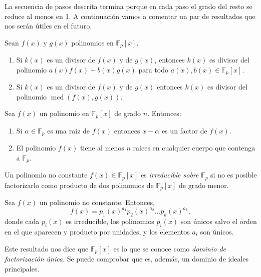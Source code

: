 La secuencia de pasos descrita termina porque en cada paso el grado del resto se reduce al menos en 1.
A continuación vamos a comentar un par de resultados que nos serán útiles en el futuro.

\begin{proposition}
  \label{prop:k-divisor-f-g}
  Sean \(f(x)\) y \(g(x)\) polinomios en \(\mathbb F_p[x]\).
  \begin{enumerate}
    \item Si \(k(x)\) es un divisor de \(f(x)\) y de \(g(x)\), entonces \(k(x)\) es divisor del polinomio \(a(x)f(x) + b(x)g(x)\) para todo \(a(x), b(x) \in \mathbb F_p[x]\).
    \item Si \(k(x)\) es un divisor de \(f(x)\) y de \(g(x)\) entonces \(k(x)\) es divisor del polinomio \(\operatorname{mcd}(f(x), g(x))\).
  \end{enumerate}
\end{proposition}

\begin{proposition}
  \label{prop:raices-factores-pol-Fp}
  Sea \(f(x)\) un polinomio en \(\mathbb F_p[x]\) de grado \(n\). 
  Entonces: 
  \begin{enumerate}
    \item Si \(\alpha \in \mathbb F_p\) es una raíz de \(f(x)\) entonces \(x - \alpha\) es un factor de \(f(x)\).
    \item El polinomio \(f(x)\) tiene al menos \(n\) raíces en cualquier cuerpo que contenga a \(\mathbb F_p\).
  \end{enumerate}
\end{proposition}

Un polinomio no constante \(f(x) \in \mathbb F_p[x]\) es \textit{irreducible sobre} \(\mathbb F_p\) si no es posible factorizarlo como producto de dos polinomios de \(\mathbb F_p[x]\) de grado menor.
\begin{theorem}
  Sea \(f(x)\) un polinomio no constante. Entonces, 
  \[
    f(x) = p_1(x)^{a_1}p_2(x)^{a_2}\dots p_k(x)^{a_k},
  \]
  donde cada \(p_i(x)\) es irreducible, los polinomios \(p_i(x)\) son únicos salvo el orden en el que aparecen y producto por unidades, y los elementos \(a_i\) son únicos.
\end{theorem}
Este resultado nos dice que \(\mathbb F_p[x]\) es lo que se conoce como \textit{dominio de factorización única}.
Se puede comprobar que es, además, un dominio de ideales principales.



